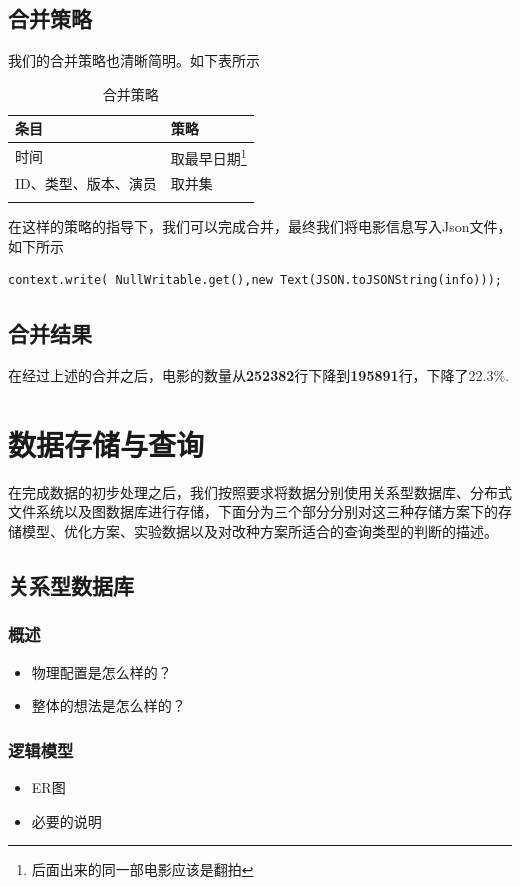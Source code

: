 \documentclass{ctexrep}
\begin{document}
	\section{合并策略}
	我们的合并策略也清晰简明。如下表所示\begin{longtable}{l|l}
		\hline
		条目 & 策略 \\
		\hline
		\hline
		时间 & 取最早日期\footnote{后面出来的同一部电影应该是翻拍} \\
		ID、类型、版本、演员 & 取并集\\
		\hline
		\caption{合并策略}
	\end{longtable}
		在这样的策略的指导下，我们可以完成合并，最终我们将电影信息写入Json文件，如下所示\begin{lstlisting}
context.write( NullWritable.get(),new Text(JSON.toJSONString(info)));
\end{lstlisting}
\section{合并结果}
在经过上述的合并之后，电影的数量从\textbf{252382}行下降到\textbf{195891}行，下降了22.3\%.
	
	\chapter{数据存储与查询}
	在完成数据的初步处理之后，我们按照要求将数据分别使用关系型数据库、分布式文件系统以及图数据库进行存储，下面分为三个部分分别对这三种存储方案下的存储模型、优化方案、实验数据以及对改种方案所适合的查询类型的判断的描述。
	\section{关系型数据库}
	\subsection{概述}
	\begin{itemize}
		\item 物理配置是怎么样的？
		\item 整体的想法是怎么样的？
	\end{itemize}
	\subsection{逻辑模型}
	\begin{itemize}
		\item ER图
		\item 必要的说明
	\end{itemize}
\end{document}
